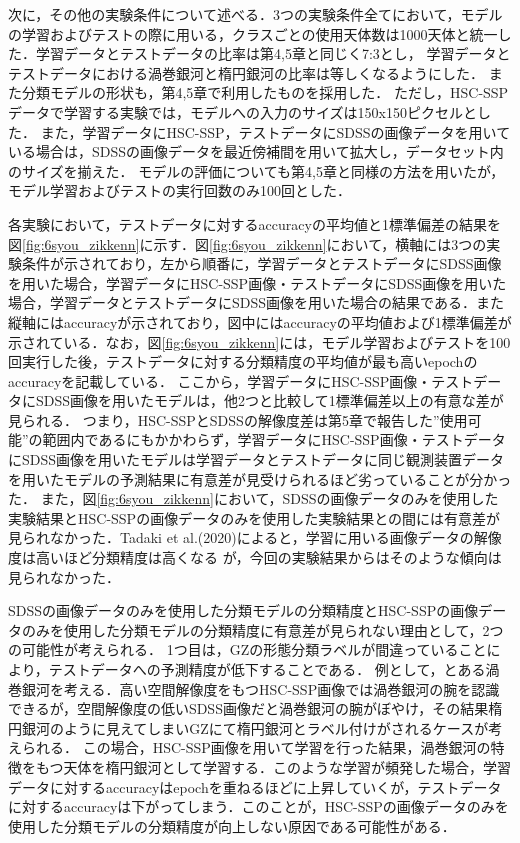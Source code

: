 \documentclass[a4j, 11pt]{jreport}
\begin{document}
次に，その他の実験条件について述べる．3つの実験条件全てにおいて，モデルの学習およびテストの際に用いる，クラスごとの使用天体数は1000天体と統一した．学習データとテストデータの比率は第4,5章と同じく7:3とし，
学習データとテストデータにおける渦巻銀河と楕円銀河の比率は等しくなるようにした．
また分類モデルの形状も，第4,5章で利用したものを採用した．
ただし，HSC-SSPデータで学習する実験では，モデルへの入力のサイズは150x150ピクセルとした．
また，学習データにHSC-SSP，テストデータにSDSSの画像データを用いている場合は，SDSSの画像データを最近傍補間を用いて拡大し，データセット内のサイズを揃えた．
モデルの評価についても第4,5章と同様の方法を用いたが，モデル学習およびテストの実行回数のみ100回とした．

各実験において，テストデータに対するaccuracyの平均値と1標準偏差の結果を図\ref{fig:6syou_zikkenn}に示す．図\ref{fig:6syou_zikkenn}において，横軸には3つの実験条件が示されており，左から順番に，学習データとテストデータにSDSS画像を用いた場合，学習データにHSC-SSP画像・テストデータにSDSS画像を用いた場合，学習データとテストデータにSDSS画像を用いた場合の結果である．また縦軸にはaccuracyが示されており，図中にはaccuracyの平均値および1標準偏差が示されている．なお，図\ref{fig:6syou_zikkenn}には，モデル学習およびテストを100回実行した後，テストデータに対する分類精度の平均値が最も高いepochのaccuracyを記載している．
ここから，学習データにHSC-SSP画像・テストデータにSDSS画像を用いたモデルは，他2つと比較して1標準偏差以上の有意な差が見られる．
つまり，HSC-SSPとSDSSの解像度差は第5章で報告した''使用可能''の範囲内であるにもかかわらず，学習データにHSC-SSP画像・テストデータにSDSS画像を用いたモデルは学習データとテストデータに同じ観測装置データを用いたモデルの予測結果に有意差が見受けられるほど劣っていることが分かった．
また，図\ref{fig:6syou_zikkenn}において，SDSSの画像データのみを使用した実験結果とHSC-SSPの画像データのみを使用した実験結果との間には有意差が見られなかった．Tadaki et al.(2020)によると，学習に用いる画像データの解像度は高いほど分類精度は高くなる
が，今回の実験結果からはそのような傾向は見られなかった．

SDSSの画像データのみを使用した分類モデルの分類精度とHSC-SSPの画像データのみを使用した分類モデルの分類精度に有意差が見られない理由として，2つの可能性が考えられる．
1つ目は，GZの形態分類ラベルが間違っていることにより，テストデータへの予測精度が低下することである．
例として，とある渦巻銀河を考える．高い空間解像度をもつHSC-SSP画像では渦巻銀河の腕を認識できるが，空間解像度の低いSDSS画像だと渦巻銀河の腕がぼやけ，その結果楕円銀河のように見えてしまいGZにて楕円銀河とラベル付けがされるケースが考えられる．
この場合，HSC-SSP画像を用いて学習を行った結果，渦巻銀河の特徴をもつ天体を楕円銀河として学習する．このような学習が頻発した場合，学習データに対するaccuracyはepochを重ねるほどに上昇していくが，テストデータに対するaccuracyは下がってしまう．このことが，HSC-SSPの画像データのみを使用した分類モデルの分類精度が向上しない原因である可能性がある．
\end{document}
